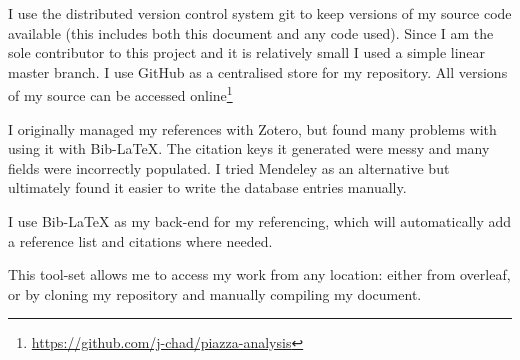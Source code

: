 \documentclass{scrartcl}
\begin{document}
I use the distributed version control system git to keep versions of my source code available (this includes both this document and any code used). Since I am the sole contributor to this project and it is relatively small I used a simple linear master branch. I use GitHub as a centralised store for my repository. All versions of my source can be accessed online\footnote{\url{https://github.com/j-chad/piazza-analysis}}

I originally managed my references with Zotero, but found many problems with using it with Bib-\LaTeX{}. The citation keys it generated were messy and many fields were incorrectly populated. I tried Mendeley as an alternative but ultimately found it easier to write the database entries manually.

I use Bib-\LaTeX{} as my back-end for my referencing, which will automatically add a reference list and citations where needed.

This tool-set allows me to access my work from any location: either from overleaf, or by cloning my repository and manually compiling my document.

\printnoidxglossary[type=\acronymtype]
\printbibliography
\end{document}
